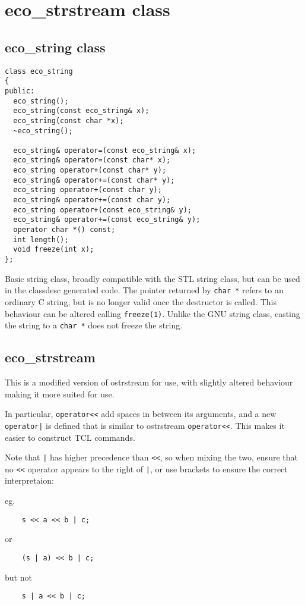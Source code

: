 \section{eco\_strstream class}

\subsection{eco\_string class}

\begin{verbatim}
class eco_string
{
public:
  eco_string();
  eco_string(const eco_string& x);
  eco_string(const char *x);
  ~eco_string();

  eco_string& operator=(const eco_string& x);
  eco_string& operator=(const char* x);
  eco_string operator+(const char* y);
  eco_string& operator+=(const char* y); 
  eco_string operator+(const char y); 
  eco_string& operator+=(const char y); 
  eco_string operator+(const eco_string& y);
  eco_string& operator+=(const eco_string& y);
  operator char *() const;
  int length();
  void freeze(int x);
};
\end{verbatim}

Basic string class, broadly compatible with the STL string class, but
can be used in the classdesc generated code. The
pointer returned by {\tt char *} refers to an ordinary C string, but
is no longer valid once the destructor is called. This behaviour can
be altered calling {\tt freeze(1)}. Unlike the GNU string class,
casting the string to a {\tt char *} does not freeze the string.

\subsection{eco\_strstream}

This is a modified version of ostrstream for \EcoLab{} use, with
slightly altered behaviour making it more suited for \EcoLab{} use.

In particular, \verb+operator<<+ add spaces in between its arguments,
and a new \verb+operator|+ is defined that is similar to ostrstream
\verb+operator<<+. This makes it easier to construct TCL commands.

Note that \verb+|+ has higher precedence than \verb+<<+, so when
mixing the two, ensure that no \verb+<<+ operator appears to the right
of \verb+|+, or use brackets to ensure the correct interpretaion:

eg.
\begin{verbatim}
    s << a << b | c;
\end{verbatim}
or
\begin{verbatim}
    (s | a) << b | c;
\end{verbatim}
but not
\begin{verbatim}
    s | a << b | c;
\end{verbatim}

